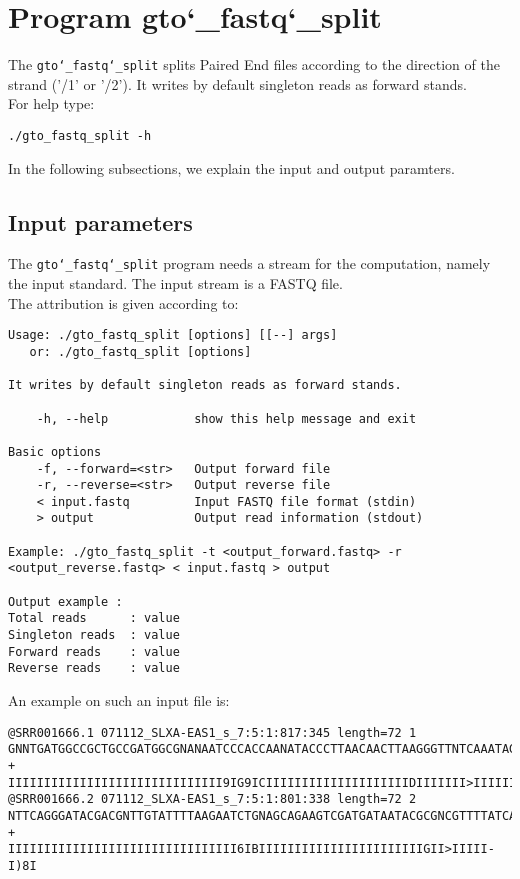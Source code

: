 \section{Program gto\char`_fastq\char`_split}
The \texttt{gto\char`_fastq\char`_split} splits Paired End files according to the direction of the strand ('/1' or '/2'). It writes by default singleton reads as forward stands. \\
For help type:
\begin{lstlisting}
./gto_fastq_split -h
\end{lstlisting}
In the following subsections, we explain the input and output paramters.

\subsection*{Input parameters}

The \texttt{gto\char`_fastq\char`_split} program needs a stream for the computation,
namely the input standard. The input stream is a FASTQ file.\\
The attribution is given according to:
\begin{lstlisting}
Usage: ./gto_fastq_split [options] [[--] args]
   or: ./gto_fastq_split [options]

It writes by default singleton reads as forward stands.

    -h, --help            show this help message and exit

Basic options
    -f, --forward=<str>   Output forward file
    -r, --reverse=<str>   Output reverse file
    < input.fastq         Input FASTQ file format (stdin)
    > output         	  Output read information (stdout)

Example: ./gto_fastq_split -t <output_forward.fastq> -r <output_reverse.fastq> < input.fastq > output

Output example :
Total reads      : value
Singleton reads  : value
Forward reads    : value
Reverse reads    : value
\end{lstlisting}
An example on such an input file is:
\begin{lstlisting}
@SRR001666.1 071112_SLXA-EAS1_s_7:5:1:817:345 length=72 1
GNNTGATGGCCGCTGCCGATGGCGNANAATCCCACCAANATACCCTTAACAACTTAAGGGTTNTCAAATAGA
+
IIIIIIIIIIIIIIIIIIIIIIIIIIIIII9IG9ICIIIIIIIIIIIIIIIIIIIIDIIIIIII>IIIIII/
@SRR001666.2 071112_SLXA-EAS1_s_7:5:1:801:338 length=72 2
NTTCAGGGATACGACGNTTGTATTTTAAGAATCTGNAGCAGAAGTCGATGATAATACGCGNCGTTTTATCAN
+
IIIIIIIIIIIIIIIIIIIIIIIIIIIIIIII6IBIIIIIIIIIIIIIIIIIIIIIIIGII>IIIII-I)8I
\end{lstlisting}

